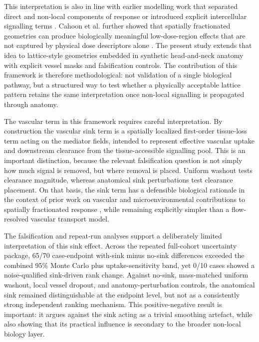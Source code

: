 \documentclass[10pt,a4paper]{article}
\begin{document}
This interpretation is also in line with earlier modelling work that separated direct and non-local components of response or introduced explicit intercellular signalling terms \cite{ebert2010framework,mcmahon2013kinetic,peng2018models}. Cahoon et al. further showed that spatially fractionated geometries can produce biologically meaningful low-dose-region effects that are not captured by physical dose descriptors alone \cite{cahoon2021spatial}. The present study extends that idea to lattice-style geometries embedded in synthetic head-and-neck anatomy with explicit vessel masks and falsification controls. The contribution of this framework is therefore methodological: not validation of a single biological pathway, but a structured way to test whether a physically acceptable lattice pattern retains the same interpretation once non-local signalling is propagated through anatomy.

The vascular term in this framework requires careful interpretation. By construction the vascular sink term is a spatially localized first-order tissue-loss term acting on the mediator fields, intended to represent effective vascular uptake and downstream clearance from the tissue-accessible signalling pool. This is an important distinction, because the relevant falsification question is not simply how much signal is removed, but where removal is placed. Uniform washout tests clearance magnitude, whereas anatomical sink perturbations test clearance placement. On that basis, the sink term has a defensible biological rationale in the context of prior work on vascular and microenvironmental contributions to spatially fractionated response \cite{bouchet2015vascular,ortiz2024tumor,lu2024combining}, while remaining explicitly simpler than a flow-resolved vascular transport model.

The falsification and repeat-run analyses support a deliberately limited interpretation of this sink effect. Across the repeated full-cohort uncertainty package, 65/70 case-endpoint with-sink minus no-sink differences exceeded the combined 95\% Monte Carlo plus uptake-sensitivity band, yet 0/10 cases showed a noise-qualified sink-driven rank change. Against no-sink, mass-matched uniform washout, local vessel dropout, and anatomy-perturbation controls, the anatomical sink remained distinguishable at the endpoint level, but not as a consistently strong independent ranking mechanism. This positive-negative result is important: it argues against the sink acting as a trivial smoothing artefact, while also showing that its practical influence is secondary to the broader non-local biology layer.
\end{document}
